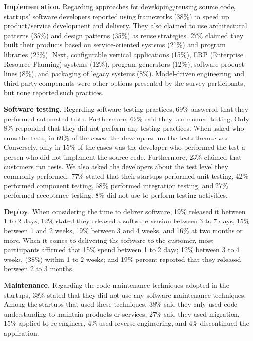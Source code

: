 \documentclass[runningheads]{llncs}
\begin{document}
\textbf{Implementation.} Regarding approaches for developing/reusing source code, startups' software developers reported using frameworks (38\%) to speed up product/service development and delivery. They also claimed to use architectural patterns (35\%) and design patterns (35\%) as reuse strategies. 27\% claimed they built their products based on service-oriented systems (27\%) and program libraries (23\%). Next, configurable vertical applications (15\%), ERP (Enterprise Resource Planning) systems (12\%), program generators (12\%), software product lines (8\%), and packaging of legacy systems (8\%). Model-driven engineering and third-party components were other options presented by the survey participants, but none reported such practices.

\textbf{Software testing.} Regarding software testing practices, 69\% answered that they performed automated tests. Furthermore, 62\% said they use manual testing. Only 8\% responded that they did not perform any testing practices. When asked who runs the tests, in 69\% of the cases, the developers run the tests themselves. Conversely, only in 15\% of the cases was the developer who performed the test a person who did not implement the source code. Furthermore, 23\% claimed that customers ran tests. We also asked the developers about the test level they commonly performed. 77\% stated that their startups performed unit testing, 42\% performed component testing, 58\% performed integration testing, and 27\% performed acceptance testing. 8\% did not use to perform testing activities.

\textbf{Deploy}. When considering the time to deliver software, 19\% released it between 1 to 2 days, 12\% stated they released a software version between 3 to 7 days, 15\% between 1 and 2 weeks, 19\% between 3 and 4 weeks, and 16\% at two months or more. When it comes to delivering the software to the customer, most participants affirmed that 15\% spend between 1 to 2 days; 12\% between 3 to 4 weeks, (38\%) within 1 to 2 weeks; and 19\% percent reported that they released between 2 to 3 months.

\textbf{Maintenance.} Regarding the code maintenance techniques adopted in the startups, 38\% stated that they did not use any software maintenance techniques. Among the startups that used these techniques, 38\% said they only used code understanding to maintain products or services, 27\% said they used migration, 15\% applied to re-engineer, 4\% used reverse engineering, and 4\% discontinued the application.
\end{document}
